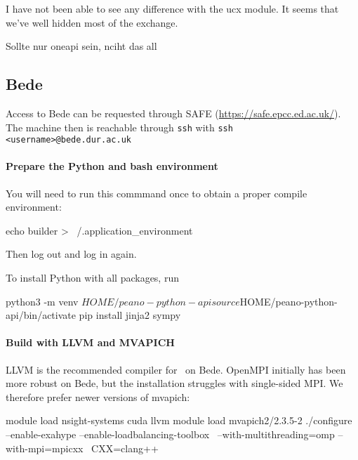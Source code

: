 I have not been able to see any difference with the ucx module. It seems that
we've well hidden most of the exchange.




Sollte nur oneapi sein, nciht das all







\subsection{Bede}


Access to Bede can be requested through SAFE
(\url{https://safe.epcc.ed.ac.uk/}).
The machine then is reachable through \texttt{ssh} with \texttt{ssh
<username>@bede.dur.ac.uk}


\paragraph{Prepare the Python and bash environment}

You will need to run this commmand once to obtain a proper compile environment:
\begin{code}
echo builder > ~/.application_environment
\end{code}
Then log out and log in again.


To install Python with all packages, run
\begin{code}
python3 -m venv $HOME/peano-python-api
source $HOME/peano-python-api/bin/activate
pip install jinja2 sympy
\end{code}


\paragraph{Build with LLVM and MVAPICH}


LLVM is the recommended compiler for \Peano\ on Bede. 
OpenMPI initially has been more robust on Bede, but the installation struggles
with single-sided MPI. 
We therefore prefer newer versions of mvapich:

\begin{code}
module load nsight-systems cuda llvm
module load mvapich2/2.3.5-2 
./configure --enable-exahype --enable-loadbalancing-toolbox \
 --with-multithreading=omp  --with-mpi=mpicxx \
 CXX=clang++
\end{code}

